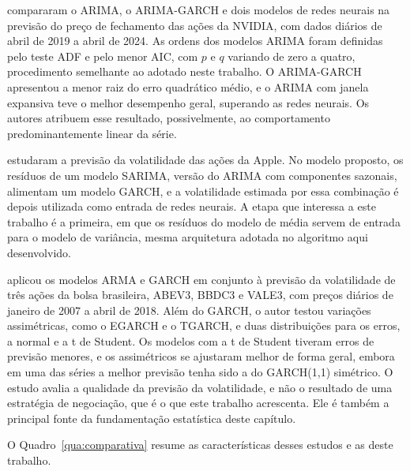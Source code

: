 compararam o ARIMA, o ARIMA-GARCH e dois modelos de redes
neurais na previsão do preço de fechamento das ações da NVIDIA, com dados diários
de abril de 2019 a abril de 2024. As ordens dos modelos ARIMA foram definidas pelo
teste ADF e pelo menor AIC, com $p$ e $q$ variando de zero a quatro, procedimento
semelhante ao adotado neste trabalho. O ARIMA-GARCH apresentou a menor raiz do erro
quadrático médio, e o ARIMA com janela expansiva teve o melhor desempenho geral,
superando as redes neurais. Os autores atribuem esse resultado, possivelmente, ao
comportamento predominantemente linear da série.

 estudaram a previsão da volatilidade das ações da Apple.
No modelo proposto, os resíduos de um modelo SARIMA, versão do ARIMA com
componentes sazonais, alimentam um modelo GARCH, e a volatilidade estimada por essa combinação é depois utilizada como
entrada de redes neurais. A etapa que interessa a este trabalho é a primeira, em
que os resíduos do modelo de média servem de entrada para o modelo de variância,
mesma arquitetura adotada no algoritmo aqui desenvolvido.

 aplicou os modelos ARMA e GARCH em conjunto à previsão da
volatilidade de três ações da bolsa brasileira, ABEV3, BBDC3 e VALE3, com preços
diários de janeiro de 2007 a abril de 2018. Além do GARCH, o autor testou variações
assimétricas, como o EGARCH e o TGARCH, e duas distribuições para os erros, a
normal e a t de Student. Os modelos com a t de Student tiveram erros de previsão
menores, e os assimétricos se ajustaram melhor de forma geral, embora em uma das
séries a melhor previsão tenha sido a do GARCH(1,1) simétrico. O estudo avalia a
qualidade da previsão da volatilidade, e não o resultado de uma estratégia de
negociação, que é o que este trabalho acrescenta. Ele é também a principal fonte
da fundamentação estatística deste capítulo.

O Quadro~\ref{qua:comparativa} resume as características desses estudos e as
deste trabalho.


